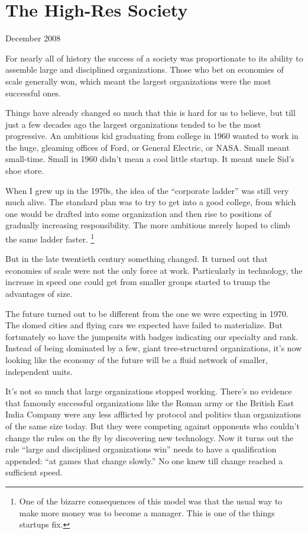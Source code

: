 \chapter{The High-Res Society}

December 2008

For nearly all of history the success of a society was proportionate to
its ability to assemble large and disciplined organizations. Those who
bet on economies of scale generally won, which meant the largest
organizations were the most successful ones.

Things have already changed so much that this is hard for us to believe,
but till just a few decades ago the largest organizations tended to be
the most progressive. An ambitious kid graduating from college in 1960
wanted to work in the huge, gleaming offices of Ford, or General
Electric, or NASA. Small meant small-time. Small in 1960 didn't mean a
cool little startup. It meant uncle Sid's shoe store.

When I grew up in the 1970s, the idea of the ``corporate ladder'' was
still very much alive. The standard plan was to try to get into a good
college, from which one would be drafted into some organization and then
rise to positions of gradually increasing responsibility. The more
ambitious merely hoped to climb the same ladder faster.
\footnote{One of the bizarre consequences of this model was that the usual
way to make more money was to become a manager. This is one of the
things startups fix.}

But in the late twentieth century something changed. It turned out that
economies of scale were not the only force at work. Particularly in
technology, the increase in speed one could get from smaller groups
started to trump the advantages of size.

The future turned out to be different from the one we were expecting in
1970. The domed cities and flying cars we expected have failed to
materialize. But fortunately so have the jumpsuits with badges
indicating our specialty and rank. Instead of being dominated by a few,
giant tree-structured organizations, it's now looking like the economy
of the future will be a fluid network of smaller, independent units.

It's not so much that large organizations stopped working. There's no
evidence that famously successful organizations like the Roman army or
the British East India Company were any less afflicted by protocol and
politics than organizations of the same size today. But they were
competing against opponents who couldn't change the rules on the fly by
discovering new technology. Now it turns out the rule ``large and
disciplined organizations win'' needs to have a qualification appended:
``at games that change slowly.'' No one knew till change reached a
sufficient speed.

